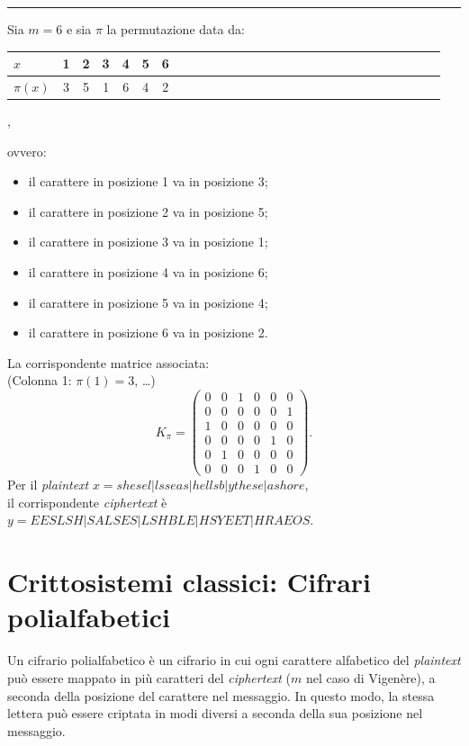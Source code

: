 \vspace{1em}
\hrule
\begin{example}
    Sia $m=6$ e sia $\pi$ la permutazione data da:


    \begin{center}
    \begin{tabular}{l|*{27}{c}}
        $x$ & 1 &2 &3 &4 &5 &6  \\
        \hline
        $\pi(x)$ & 3 &5 &1& 6 &4 &2
    \end{tabular},
    \end{center}

    ovvero:
    \begin{itemize}
        \item il carattere in posizione 1 va in posizione 3;
        \item il carattere in posizione 2 va in posizione 5;
        \item il carattere in posizione 3 va in posizione 1;
        \item il carattere in posizione 4 va in posizione 6;
        \item il carattere in posizione 5 va in posizione 4;
        \item il carattere in posizione 6 va in posizione 2.
    \end{itemize}

    \noindent La corrispondente matrice associata:\\ (Colonna 1: \(\pi(1)=3\), \dots)
    \[
        K_\pi =
        \begin{pmatrix}
        0 & 0 & 1 & 0 & 0 & 0 \\
        0 & 0 & 0 & 0 & 0 & 1 \\
        1 & 0 & 0 & 0 & 0 & 0 \\
        0 & 0 & 0 & 0 & 1 & 0 \\
        0 & 1 & 0 & 0 & 0 & 0 \\
        0 & 0 & 0 & 1 & 0 & 0
        \end{pmatrix}.
    \]
    \noindent Per il \textit{plaintext} $x=shesel|lsseas|hellsb|ythese|ashore$, \\ il corrispondente \textit{ciphertext} è $y=EESLSH|SALSES|LSHBLE|HSYEET|HRAEOS$. 
\end{example}


    \newpage
    \section{Crittosistemi classici: Cifrari polialfabetici}
    Un cifrario polialfabetico è un cifrario in cui ogni carattere alfabetico del \textit{plaintext} può essere mappato in più caratteri del \textit{ciphertext} ($m$ nel caso di Vigenère), a seconda della posizione del carattere nel messaggio. In questo modo, la stessa lettera può essere criptata in modi diversi a seconda della sua posizione nel messaggio.

